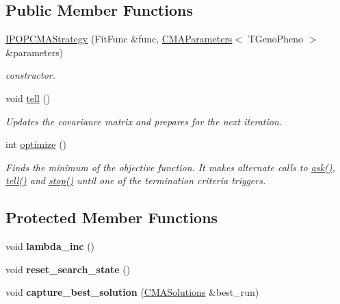 \subsection*{Public Member Functions}
\begin{DoxyCompactItemize}
\item 
\hyperlink{classlibcmaes_1_1IPOPCMAStrategy_a0fad3e1160695878d2d8075a4cddf786}{I\-P\-O\-P\-C\-M\-A\-Strategy} (Fit\-Func \&func, \hyperlink{classlibcmaes_1_1CMAParameters}{C\-M\-A\-Parameters}$<$ T\-Geno\-Pheno $>$ \&parameters)
\begin{DoxyCompactList}\small\item\em constructor. \end{DoxyCompactList}\item 
\hypertarget{classlibcmaes_1_1IPOPCMAStrategy_a9b3b59e7caf752f48b37500d84736137}{void \hyperlink{classlibcmaes_1_1IPOPCMAStrategy_a9b3b59e7caf752f48b37500d84736137}{tell} ()}\label{classlibcmaes_1_1IPOPCMAStrategy_a9b3b59e7caf752f48b37500d84736137}

\begin{DoxyCompactList}\small\item\em Updates the covariance matrix and prepares for the next iteration. \end{DoxyCompactList}\item 
int \hyperlink{classlibcmaes_1_1IPOPCMAStrategy_a9c4f8ae0a8cbf600ba8fe7270e63172a}{optimize} ()
\begin{DoxyCompactList}\small\item\em Finds the minimum of the objective function. It makes alternate calls to \hyperlink{classlibcmaes_1_1CMAStrategy_ab7266bc50732458ffcab690bc26380e6}{ask()}, \hyperlink{classlibcmaes_1_1IPOPCMAStrategy_a9b3b59e7caf752f48b37500d84736137}{tell()} and \hyperlink{classlibcmaes_1_1CMAStrategy_adc87b9c500959c800b6bc93d89432ecc}{stop()} until one of the termination criteria triggers. \end{DoxyCompactList}\end{DoxyCompactItemize}
\subsection*{Protected Member Functions}
\begin{DoxyCompactItemize}
\item 
\hypertarget{classlibcmaes_1_1IPOPCMAStrategy_a210bde295a32c8da7906729831fcf5e2}{void {\bfseries lambda\-\_\-inc} ()}\label{classlibcmaes_1_1IPOPCMAStrategy_a210bde295a32c8da7906729831fcf5e2}

\item 
\hypertarget{classlibcmaes_1_1IPOPCMAStrategy_a8de562ec27e295c3b2517b1669fef0be}{void {\bfseries reset\-\_\-search\-\_\-state} ()}\label{classlibcmaes_1_1IPOPCMAStrategy_a8de562ec27e295c3b2517b1669fef0be}

\item 
\hypertarget{classlibcmaes_1_1IPOPCMAStrategy_a2f4d09dc1a86de8e4a1116cce4e518e8}{void {\bfseries capture\-\_\-best\-\_\-solution} (\hyperlink{classlibcmaes_1_1CMASolutions}{C\-M\-A\-Solutions} \&best\-\_\-run)}\label{classlibcmaes_1_1IPOPCMAStrategy_a2f4d09dc1a86de8e4a1116cce4e518e8}

\end{DoxyCompactItemize}
